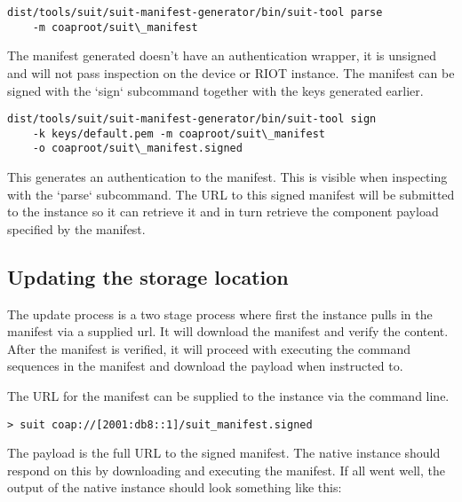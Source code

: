 \documentclass[../main.tex]{subfiles}
\begin{document}
\begin{lstlisting}
dist/tools/suit/suit-manifest-generator/bin/suit-tool parse
	-m coaproot/suit\_manifest
\end{lstlisting}

The manifest generated doesn't have an authentication wrapper, it is unsigned
and will not pass inspection on the device or RIOT instance. The manifest can be
signed with the `sign` subcommand together with the keys generated earlier.

\begin{lstlisting}
dist/tools/suit/suit-manifest-generator/bin/suit-tool sign
	-k keys/default.pem -m coaproot/suit\_manifest
	-o coaproot/suit\_manifest.signed
\end{lstlisting}

This generates an authentication to the manifest. This is visible when
inspecting with the `parse` subcommand. The URL to this signed manifest will be
submitted to the instance so it can retrieve it and in turn retrieve the
component payload specified by the manifest.

\subsection{Updating the storage location}

The update process is a two stage process where first the instance pulls in the
manifest via a supplied url. It will download the manifest and verify the
content. After the manifest is verified, it will proceed with executing the
command sequences in the manifest and download the payload when instructed to.

The URL for the manifest can be supplied to the instance via the command line.

\begin{lstlisting}
> suit coap://[2001:db8::1]/suit_manifest.signed
\end{lstlisting}

The payload is the full URL to the signed manifest. The native instance should
respond on this by downloading and executing the manifest. If all went well, the
output of the native instance should look something like this:
\end{document}
